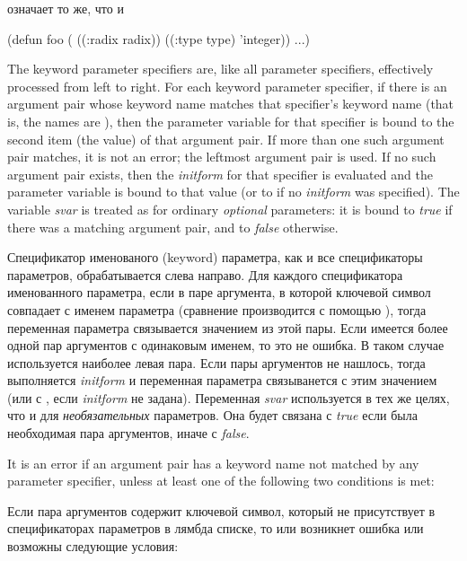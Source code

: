 означает то же, что и

\begin{lisp}
(defun foo ( ((:radix radix)) ((:type type) 'integer)) ...)
\end{lisp}

The keyword parameter specifiers are, like all parameter specifiers,
effectively processed from left to right.
For each keyword parameter specifier, if there is an argument
pair whose keyword name matches that specifier's keyword name
(that is, the names are ),
then the parameter variable for that specifier is bound to the
second item (the value) of that argument pair.
If more than one such argument pair matches, it is not an error;
the leftmost argument pair is used.
If no such argument pair exists, then
the \textit{initform} for that specifier is evaluated
and the parameter variable is bound to that value (or to {\false} if
no \textit{initform} was specified).  The variable \textit{svar} is treated
as for ordinary \textit{optional} parameters: it is bound to \textit{true}
if there was a matching argument pair, and to \textit{false} otherwise.

Спецификатор именованого (keyword) параметра, как и все спецификаторы
параметров, обрабатывается слева направо.
Для каждого спецификатора именованного параметра, если в паре аргумента, в
которой ключевой символ совпадает с именем параметра (сравнение производится с
помощью ), тогда переменная параметра связывается значением из этой
пары.
Если имеется более одной пар аргументов с одинаковым именем, то это не ошибка. В таком
случае используется наиболее левая пара.
Если пары аргументов не нашлось, тогда выполняется \textit{initform} и
переменная параметра связыванется с этим значением (или с {\false}, если
\textit{initform} не задана). Переменная \textit{svar} используется в тех же
целях, что и для \textit{необязательных} параметров. Она будет связана с
\textit{true} если была необходимая пара аргументов, иначе с \textit{false}.

It is an error if an argument pair has a keyword name not matched
by any parameter specifier, unless at least one of the following
two conditions is met:

Если пара аргументов содержит ключевой символ, который не
присутствует в спецификаторах параметров в лямбда списке, то или возникнет
ошибка или возможны следующие условия:

